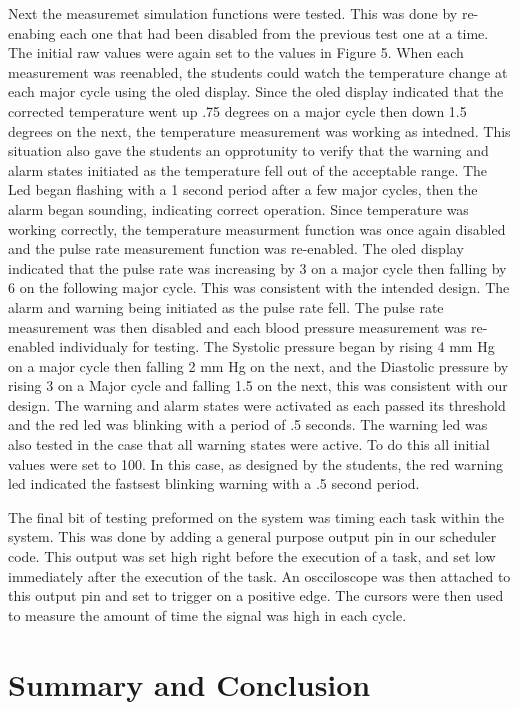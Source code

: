 \documentclass[12pt]{article} %
\begin{document}
Next the measuremet simulation functions were tested. This was done by re-enabing each one that had been disabled from the previous test one at a time. The initial raw values were again set to the values in Figure 5. When each measurement was reenabled, the students could watch the temperature change at each major cycle using the oled display. Since the oled display indicated that the corrected temperature went up .75 degrees on a major cycle then down 1.5 degrees on the next, the temperature measurement was working as intedned. This situation also gave the students an opprotunity to verify that the warning and alarm states initiated as the temperature fell out of the acceptable range. The Led began flashing with a 1 second period after a few major cycles, then the alarm began sounding, indicating correct operation. Since temperature was working correctly, the temperature measurment function was once again disabled and the pulse rate measurement function was re-enabled. The oled display indicated that the pulse rate was increasing by 3 on a major cycle then falling by 6 on the following major cycle. This was consistent with the intended design. The alarm and warning being initiated as the pulse rate fell. The pulse rate measurement was then disabled and each blood pressure measurement was re-enabled individualy for testing. The Systolic pressure began by rising 4 mm Hg on a major cycle then falling 2 mm Hg on the next, and the Diastolic pressure by rising 3 on a Major cycle and falling 1.5 on the next, this was consistent with our design. The warning and alarm states were activated as each passed its threshold and the red led was blinking with a period of .5 seconds. The warning led was also tested in the case that all warning states were active. To do this all initial values were set to 100. In this case, as designed by the students, the red warning led indicated the fastsest blinking warning with a .5 second period. 

The final bit of testing preformed on the system was timing each task within the system. This was done by adding a general purpose output pin in our scheduler code. This output was set high right before the execution of a task, and set low immediately after the execution of the task. An oscciloscope was then attached to this output pin and set to trigger on a positive edge. The cursors were then used to measure the amount of time the signal was high in each cycle.

\section{Summary and Conclusion}
\end{document}

